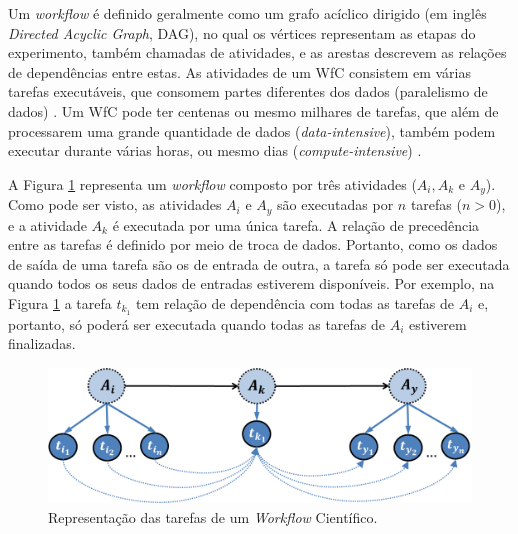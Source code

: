 Um \textit{workflow} é definido geralmente como um grafo acíclico dirigido (em inglês \textit{Directed Acyclic Graph}, DAG), no qual os vértices representam as etapas do experimento, também chamadas de atividades, e as arestas descrevem as relações de dependências entre estas. As atividades  de um WfC consistem em várias tarefas executáveis, que consomem partes diferentes dos dados (paralelismo de dados) \cite{Liu2014}. Um WfC pode ter centenas ou  mesmo milhares de tarefas, que além de processarem uma grande quantidade de dados (\textit{data-intensive}), também podem executar durante várias horas, ou mesmo dias  (\textit{compute-intensive}) \cite{Juve2013}.

A Figura \ref{fig:wfexec} representa um \textit{workflow}  composto por três atividades ($A_{i}, A_{k}$ e $A_{y}$). Como pode ser visto, as atividades $A_{i}$ e $A_{y}$  são executadas por $n$ tarefas ($n > 0$), e a atividade $A_{k}$ é executada por uma única tarefa. A relação de precedência entre as tarefas é definido por meio de troca de dados. Portanto, como os dados de saída de uma tarefa são os de entrada de outra, a tarefa só pode ser executada quando todos os seus dados de entradas estiverem disponíveis. Por exemplo, na Figura \ref{fig:wfexec} a tarefa $t_{k_{1}}$ tem relação de dependência com todas as tarefas de $A_{i}$ e, portanto, só poderá ser executada quando todas as tarefas de $A_{i}$ estiverem finalizadas. 

\begin{figure}[!ht]
\centering
\includegraphics[width=0.8\linewidth]{figure/wf_exec.png}
\caption{Representação das tarefas de um \textit{Workflow} Científico.}
\label{fig:wfexec}
\end{figure}





